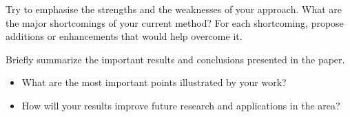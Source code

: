 \documentclass[runningheads,a4paper,11pt]{report}
\begin{document}
Try to emphasise the strengths and the weaknesses of your approach.
What are the major shortcomings of your current method? For each shortcoming, propose additions or enhancements that would help overcome it. 

Briefly summarize the important results and conclusions presented in the paper. 

\begin{itemize}
	\item What are the most important points illustrated by your work? 
	\item How will your results improve future research and applications in the area? 
\end{itemize}




\end{document}
